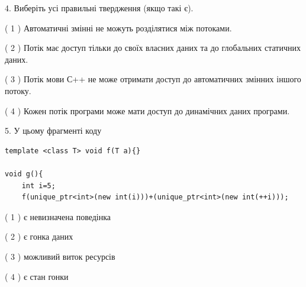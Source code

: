 \documentclass[12pt, ukrainian]{article}
\begin{document}
\begin {large}
{%
4. Виберіть усі правильні твердження (якщо такі є).\par
\vspace{2mm}

( 1 ) Автоматичні змінні не можуть розділятися між потоками.%

( 2 ) Потік має доступ тільки до своїх власних даних та до глобальних статичних даних.%

( 3 ) Потік мови С++ не може отримати доступ до автоматичних змінних іншого потоку.%

( 4 ) Кожен потік програми може мати доступ до динамічних даних програми.%


5. У цьому фрагменті коду
\begin{verbatim}
template <class T> void f(T a){}

void g(){
    int i=5;
    f(unique_ptr<int>(new int(i)))+(unique_ptr<int>(new int(++i)));
\end{verbatim}
( 1 ) є невизначена поведінка%

( 2 ) є гонка даних%

( 3 ) можливий виток ресурсів%

( 4 ) є стан гонки%
}
\end {large}
\end{document}

